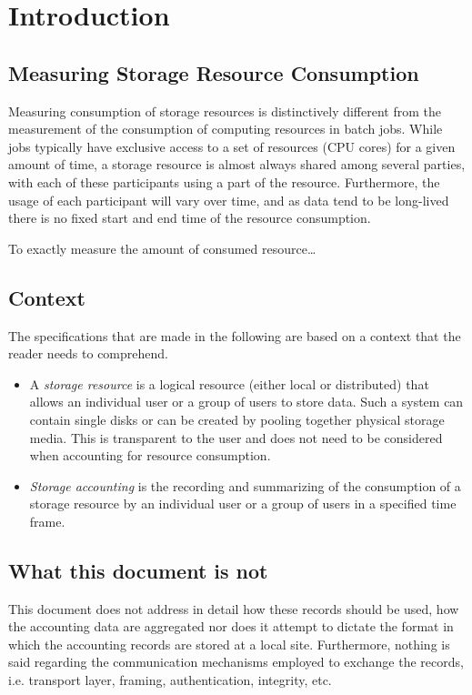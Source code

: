 \section{Introduction}

\subsection{Measuring Storage Resource Consumption}

Measuring consumption of storage resources is distinctively different from
the measurement of the consumption of computing resources in batch jobs. 
While jobs typically have exclusive access
to a set of resources (CPU cores) for a given amount of time, a storage
resource is almost always shared
among several parties, with each of these participants using a part of the
resource. Furthermore, the usage of each participant will vary over time, and as
data tend to be long-lived there is no fixed start and end time of the resource
consumption.

To exactly measure the amount of consumed resource\ldots

\subsection{Context}
The specifications that are made in the following are based
on a context that the reader needs to comprehend.
\begin{itemize}
 \item A \textit{storage resource} is a logical resource (either local or distributed) 
that allows an individual user or a group of users to store data. Such a system 
can contain single disks or can be created by pooling together physical storage 
media. This is transparent to the user and does not need to be considered when 
accounting for resource consumption.
 \item \textit{Storage accounting} is the recording and summarizing of the 
consumption of a storage resource by an individual user or a group of users in a 
specified time frame.
\end{itemize}

\subsection{What this document is not}
This document does not address in detail how these records should be used, 
how the accounting data are aggregated 
nor does it attempt to dictate the format in which the accounting records are 
stored at a local site. 
Furthermore, nothing is said regarding the communication mechanisms
employed to exchange the records, i.e. transport layer, framing, 
authentication, integrity, etc.


